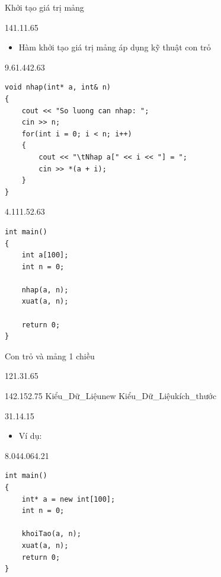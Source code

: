 \begin{frame}[fragile]{Khởi tạo giá trị mảng}
\begin{blk}{14}{1.1}{1.65}\begin{itemize}\small\item Hàm khởi tạo giá trị mảng áp dụng kỹ thuật con trỏ\end{itemize}\end{blk}
\begin{blk}{9.6}{1.44}{2.63}
\begin{lstlisting}[basicstyle=\cf{10.4}]
void nhap(int* a, int& n)
{
    cout << "So luong can nhap: ";
    cin >> n;
    for(int i = 0; i < n; i++)
    {
        cout << "\tNhap a[" << i << "] = ";
        cin >> *(a + i);
    }
}
\end{lstlisting}
\end{blk}
\begin{blk}{4.1}{11.5}{2.63}
\begin{lstlisting}[basicstyle=\cf{10.4}]
int main()
{
    int a[100];
    int n = 0;

    nhap(a, n);
    xuat(a, n);

    return 0;
}
\end{lstlisting}
\end{blk}
\end{frame}

\begin{frame}[fragile]{Con trỏ và mảng 1 chiều}
\begin{blk}{12}{1.3}{1.65}\end{blk}
\begin{blk}{14}{2.15}{2.75}\fontsize{12}{14}\selectfont\ttfamily
\textcolor{codekw}{Kiểu\_Dữ\_Liệu}\textcolor{codekw}{new Kiểu\_Dữ\_Liệu}\bk{[}\textcolor{codenum}{kích\_thước}\bk{];}
\end{blk}
\begin{blk}{3}{1.1}{4.15}\begin{itemize}\small\item Ví dụ:\end{itemize}\end{blk}
\begin{blk}{8.04}{4.06}{4.21}
\begin{lstlisting}[style=red,basicstyle=\cf{10.6}]
int main()
{
    int* a = new int[100];
    int n = 0;

    khoiTao(a, n);
    xuat(a, n);
    return 0;
}
\end{lstlisting}
\end{blk}
\end{frame}

